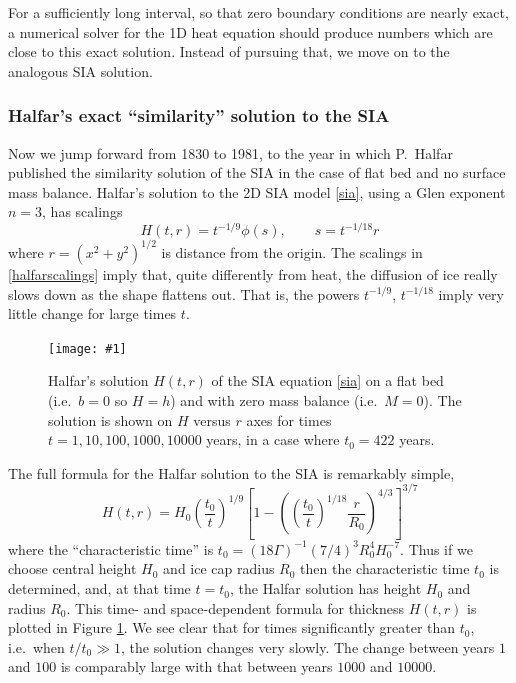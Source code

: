 \documentclass[titlepage,letterpaper,final,12pt]{scrartcl}
\newcommand{\onefigsize}[3]{
\begin{figure}[ht]
\centering
\texttt{[image: \#1]}
\caption{#2}
\label{fig:#1}
\end{figure}}
\begin{document}
For a sufficiently long interval, so that zero boundary conditions are nearly exact, a numerical solver for the 1D heat equation should produce numbers which are close to this exact solution.  Instead of pursuing that, we move on to the analogous SIA solution.

\subsubsection*{Halfar's exact ``similarity'' solution to the SIA}  Now we jump forward from 1830 to 1981, to the year in which P.~Halfar published the similarity solution of the SIA in the case of flat bed and no surface mass balance.  Halfar's solution to the 2D SIA model \eqref{sia}, using a Glen exponent $n=3$, has scalings
\begin{equation}
H(t,r)=t^{-1/9} \phi(s), \qquad s = t^{-1/18} r \label{halfarscalings}
\end{equation}
where $r=(x^2+y^2)^{1/2}$ is distance from the origin.  The scalings in \eqref{halfarscalings} imply that, quite differently from heat, the diffusion of ice really slows down as the shape flattens out.  That is, the powers $t^{-1/9}$, $t^{-1/18}$ imply very little change for large times $t$.

\onefigsize{siascaling}{Halfar's solution $H(t,r)$ of the SIA equation \eqref{sia} on a flat bed (i.e.~$b=0$ so $H=h$) and with zero mass balance (i.e.~$M=0$).  The solution is shown on $H$ versus $r$ axes for times $t=1,10,100,1000,10000$ years, in a case where $t_0=422$ years.}{5.5in}

The full formula for the Halfar solution to the SIA is remarkably simple,
\begin{equation}
H(t,r) = H_0 \left(\frac{t_0}{t}\right)^{1/9} \left[1 - \left(\left(\frac{t_0}{t}\right)^{1/18} \frac{r}{R_0}\right)^{4/3}\right]^{3/7} \label{halfar}
\end{equation}
where the ``characteristic time'' is $t_0 = (18 \Gamma)^{-1} (7/4)^3 R_0^4 H_0^{-7}$.  Thus if we choose central height $H_0$ and ice cap radius $R_0$ then the characteristic time $t_0$ is determined, and, at that time $t=t_0$, the Halfar solution has height $H_0$ and radius $R_0$.  This time- and space-dependent formula for thickness $H(t,r)$ is plotted in Figure \ref{fig:siascaling}.  We see clear that for times significantly greater than $t_0$, i.e.~when $t/t_0 \gg 1$, the solution changes very slowly.  The change between years $1$ and $100$ is comparably large with that between years $1000$ and $10000$.
\end{document}
